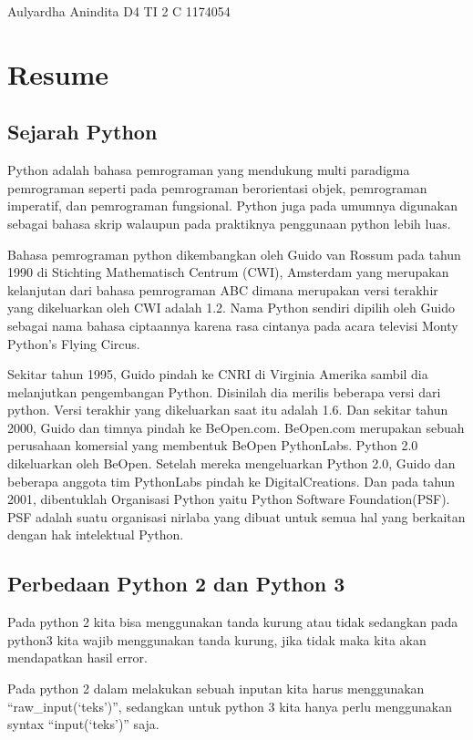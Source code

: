 \documentclass[lipt]{Article}
\begin{document}
\begin{center}
Aulyardha Anindita
D4 TI 2 C
1174054
\end{center}
\chapter{Resume}
\section{Sejarah Python}
Python adalah bahasa pemrograman yang mendukung multi paradigma pemrograman seperti pada pemrograman berorientasi objek, pemrograman imperatif, dan pemrograman fungsional. Python juga pada umumnya digunakan sebagai bahasa skrip walaupun pada praktiknya penggunaan python lebih luas. 

Bahasa pemrograman python dikembangkan oleh Guido van Rossum pada tahun 1990 di Stichting Mathematisch Centrum (CWI), Amsterdam yang merupakan kelanjutan dari bahasa pemrograman ABC dimana merupakan versi terakhir yang dikeluarkan oleh CWI adalah 1.2. Nama Python sendiri dipilih oleh Guido sebagai nama bahasa ciptaannya karena rasa cintanya pada acara televisi Monty Python’s Flying Circus.

Sekitar tahun 1995, Guido pindah ke CNRI di Virginia Amerika sambil dia melanjutkan pengembangan Python. Disinilah dia merilis beberapa versi dari python. Versi terakhir yang dikeluarkan saat itu adalah 1.6. Dan sekitar tahun 2000,  Guido dan timnya pindah ke BeOpen.com. BeOpen.com merupakan sebuah perusahaan komersial yang membentuk BeOpen PythonLabs. Python 2.0 dikeluarkan oleh BeOpen. Setelah mereka mengeluarkan Python 2.0, Guido dan beberapa anggota tim PythonLabs pindah ke DigitalCreations.
Dan pada tahun 2001, dibentuklah Organisasi Python yaitu Python Software  Foundation(PSF). PSF adalah suatu organisasi nirlaba yang dibuat untuk semua hal yang berkaitan dengan hak intelektual Python. 


\section{Perbedaan Python 2 dan Python 3}

Pada python 2 kita bisa menggunakan tanda kurung atau tidak sedangkan pada python3 kita wajib menggunakan tanda kurung, jika tidak maka kita akan mendapatkan hasil error.

Pada python 2 dalam melakukan sebuah inputan kita harus menggunakan “raw_input(‘teks’)”, sedangkan untuk python 3 kita hanya perlu menggunakan syntax “input(‘teks’)” saja.
\end{document}

